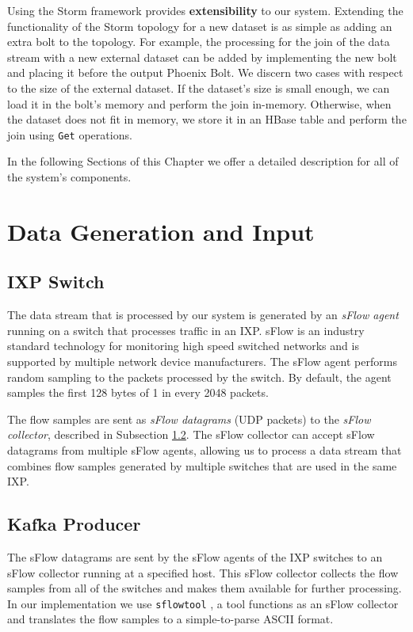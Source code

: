 Using the Storm framework provides \textbf{extensibility} to our system. Extending the functionality of the Storm topology for a new dataset is as simple as adding an extra bolt to the topology. For example, the processing for the join of the data stream with a new external dataset can be added by implementing the new bolt and placing it before the output Phoenix Bolt. We discern two cases with respect to the size of the external dataset. If the dataset's size is small enough, we can load it in the bolt's memory and perform the join in-memory. Otherwise, when the dataset does not fit in memory, we store it in an HBase table and perform the join using \texttt{Get} operations.

In the following Sections of this Chapter we offer a detailed description for all of the system's components.


\section{Data Generation and Input}

\subsection{IXP Switch}

The data stream that is processed by our system is generated by an \emph{sFlow agent} running on a switch that processes traffic in an IXP. sFlow \cite{sflow} is an industry standard technology for monitoring high speed switched networks and is supported by multiple network device manufacturers. The sFlow agent performs random sampling to the packets processed by the switch. By default, the agent samples the first 128 bytes of 1 in every 2048 packets.

The flow samples are sent as \emph{sFlow datagrams} (UDP packets) to the \emph{sFlow collector}, described in Subsection \ref{subsection:system_kafka_producer}. The sFlow collector can accept sFlow datagrams from multiple sFlow agents, allowing us to process a data stream that combines flow samples generated by multiple switches that are used in the same IXP.

\subsection{Kafka Producer}\label{subsection:system_kafka_producer}

The sFlow datagrams are sent by the sFlow agents of the IXP switches to an sFlow collector running at a specified host. This sFlow collector collects the flow samples from all of the switches and makes them available for further processing. In our implementation we use \texttt{sflowtool} \cite{sflowtool}, a tool functions as an sFlow collector and translates the flow samples to a simple-to-parse ASCII format.

